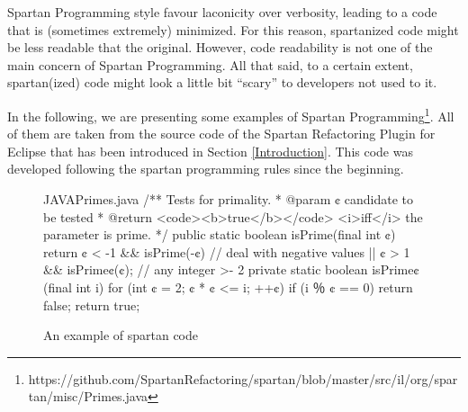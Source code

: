 Spartan Programming style favour laconicity over verbosity, leading to 
a code that is (sometimes extremely) minimized. For this reason, spartanized code might 
be less readable that the original. However, code readability is not one of 
the main concern of Spartan Programming. All that said, to a certain extent, 
spartan(ized) code might look a little bit ``scary'' to developers not used to it.

In the following, we are presenting some examples of 
Spartan Programming\footnote{https://github.com/SpartanRefactoring/spartan/blob/master/src/il/org/spartan/misc/Primes.java}.
All of them are taken from the source code of the Spartan Refactoring 
Plugin for Eclipse that has been introduced in Section \ref{Introduction}. 
This code was developed following the spartan programming rules since 
the beginning.



% 
% 
\begin{figure}[h]
\label{figure:shock-2}
\caption{An example of spartan code}
\begin{Code}{JAVA}{Primes.java}
/** Tests for primality.
  * @param ¢ candidate to be tested
  * @return <code><b>true</b></code> <i>iff</i> the parameter is prime. */
public static boolean isPrime(final int ¢) {
  return ¢ < -1 && isPrime(-¢) // deal with negative values
      || ¢ > 1 && isPrime¢(¢); // any integer >- 2
}
private static boolean isPrime¢(final int i) {
  for (int ¢ = 2; ¢ * ¢ <= i; ++¢)
    if (i ％ ¢ == 0)
      return false;
  return true;
}
\end{Code}
\end{figure}

